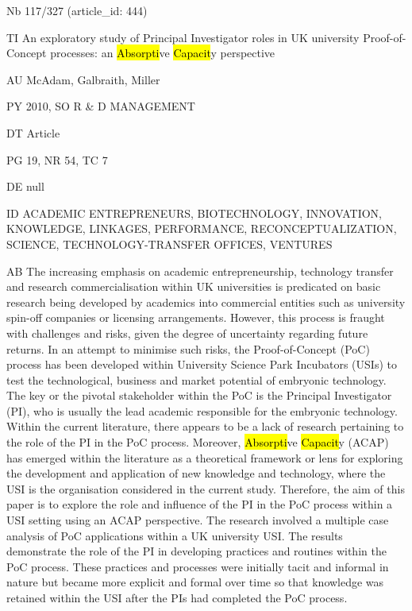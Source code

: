 \documentclass[a4paper]{article}
\begin{document}
\vspace*{-2cm}
Nb \tabto{0cm}117/327 (article\_id: 444)\par
TI \tabto{0cm}An exploratory study of Principal Investigator roles in UK university Proof-of-Concept processes: an \hl{Absorpti}ve \hl{Capacit}y perspective\par
AU \tabto{0cm}McAdam, Galbraith, Miller\par
PY \tabto{0cm}2010, SO R \& D MANAGEMENT\par
DT \tabto{0cm}Article\par
PG \tabto{0cm}19, NR 54, TC 7\par
DE \tabto{0cm}null\par
ID \tabto{0cm}ACADEMIC ENTREPRENEURS, BIOTECHNOLOGY, INNOVATION, KNOWLEDGE, LINKAGES, PERFORMANCE, RECONCEPTUALIZATION, SCIENCE, TECHNOLOGY-TRANSFER OFFICES, VENTURES\par
AB \tabto{0cm}The increasing emphasis on academic entrepreneurship, technology transfer and research commercialisation within UK universities is predicated on basic research being developed by academics into commercial entities such as university spin-off companies or licensing arrangements. However, this process is fraught with challenges and risks, given the degree of uncertainty regarding future returns. In an attempt to minimise such risks, the Proof-of-Concept (PoC) process has been developed within University Science Park Incubators (USIs) to test the technological, business and market potential of embryonic technology. The key or the pivotal stakeholder within the PoC is the Principal Investigator (PI), who is usually the lead academic responsible for the embryonic technology. Within the current literature, there appears to be a lack of research pertaining to the role of the PI in the PoC process. Moreover, \hl{Absorpti}ve \hl{Capacit}y (ACAP) has emerged within the literature as a theoretical framework or lens for exploring the development and application of new knowledge and technology, where the USI is the organisation considered in the current study. Therefore, the aim of this paper is to explore the role and influence of the PI in the PoC process within a USI setting using an ACAP perspective. The research involved a multiple case analysis of PoC applications within a UK university USI. The results demonstrate the role of the PI in developing practices and routines within the PoC process. These practices and processes were initially tacit and informal in nature but became more explicit and formal over time so that knowledge was retained within the USI after the PIs had completed the PoC process.\par
\clearpage
\end{document}
